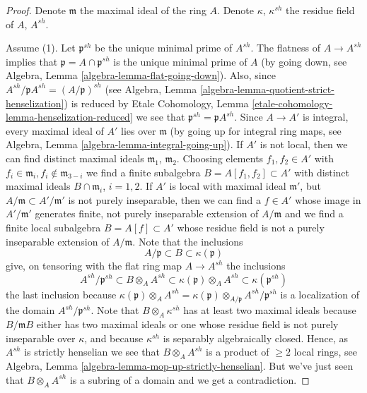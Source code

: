\begin{proof}
Denote $\mathfrak m$ the maximal ideal of the ring $A$.
Denote $\kappa$, $\kappa^{sh}$ the residue field of $A$, $A^{sh}$.

\medskip\noindent
Assume (1). Let $\mathfrak p^{sh}$ be the unique minimal prime of
$A^{sh}$. The flatness of $A \to A^{sh}$ implies that
$\mathfrak p = A \cap \mathfrak p^{sh}$ is the unique minimal
prime of $A$ (by going down, see
Algebra, Lemma \ref{algebra-lemma-flat-going-down}).
Also, since $A^{sh}/\mathfrak pA^{sh} = (A/\mathfrak p)^{sh}$ (see
Algebra, Lemma \ref{algebra-lemma-quotient-strict-henselization})
is reduced by
Etale Cohomology, Lemma \ref{etale-cohomology-lemma-henselization-reduced}
we see that $\mathfrak p^{sh} = \mathfrak pA^{sh}$.
Since $A \to A'$ is integral, every maximal ideal of $A'$ lies over
$\mathfrak m$ (by going up for integral ring maps, see
Algebra, Lemma \ref{algebra-lemma-integral-going-up}).
If $A'$ is not local, then we can find distinct maximal ideals
$\mathfrak m_1$, $\mathfrak m_2$. Choosing elements $f_1, f_2 \in A'$
with $f_i \in \mathfrak m_i, f_i \not \in \mathfrak m_{3 - i}$ we find
a finite subalgebra $B = A[f_1, f_2] \subset A'$ with distinct maximal
ideals $B \cap \mathfrak m_i$, $i = 1, 2$. If $A'$ is local with maximal
ideal $\mathfrak m'$, but $A/\mathfrak m \subset A'/\mathfrak m'$
is not purely inseparable, then we can find a $f \in A'$ whose image in
$A'/\mathfrak m'$ generates finite, not purely inseparable extension
of $A/\mathfrak m$ and we find a finite local subalgebra $B = A[f] \subset A'$
whose residue field is not a purely inseparable extension of $A/\mathfrak m$.
Note that the inclusions
$$
A/\mathfrak p \subset B \subset \kappa(\mathfrak p)
$$
give, on tensoring with the flat ring map $A \to A^{sh}$ the inclusions
$$
A^{sh}/\mathfrak p^{sh} \subset
B \otimes_A A^{sh} \subset
\kappa(\mathfrak p) \otimes_A A^{sh} \subset
\kappa(\mathfrak p^{sh})
$$
the last inclusion because
$\kappa(\mathfrak p) \otimes_A A^{sh} =
\kappa(\mathfrak p) \otimes_{A/\mathfrak p} A^{sh}/\mathfrak p^{sh}$
is a localization of the domain $A^{sh}/\mathfrak p^{sh}$.
Note that $B \otimes_A \kappa^{sh}$ has at least two maximal ideals
because $B/\mathfrak mB$ either has two maximal ideals or one whose
residue field is not purely inseparable over $\kappa$, and because
$\kappa^{sh}$ is separably algebraically closed. Hence, as
$A^{sh}$ is strictly henselian we see that
$B \otimes_A A^{sh}$ is a product of $\geq 2$ local rings, see
Algebra, Lemma \ref{algebra-lemma-mop-up-strictly-henselian}.
But we've just seen that $B \otimes_A A^{sh}$ is a subring of a domain
and we get a contradiction.


\end{proof}
